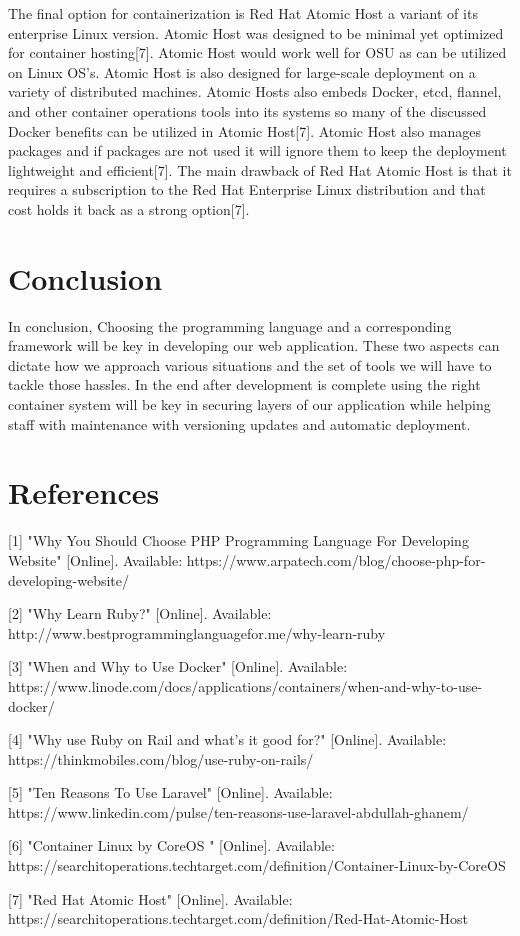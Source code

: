 \documentclass[letterpaper, 10pt, draftclsnofoot,onecolumn]{IEEEtran}
\begin{document}
The final option for containerization is Red Hat Atomic Host a variant of its enterprise Linux version. Atomic Host was designed to be minimal yet optimized for container hosting[7]. Atomic Host would work well for OSU as can be utilized on Linux OS’s. Atomic Host is also designed for large-scale deployment on a variety of distributed machines. Atomic Hosts also embeds Docker, etcd, flannel, and other container operations tools into its systems so many of the discussed Docker benefits can be utilized in Atomic Host[7]. Atomic Host also manages packages and if packages are not used it will ignore them to keep the deployment lightweight and efficient[7]. The main drawback of Red Hat Atomic Host is that it requires a subscription to the Red Hat Enterprise Linux distribution and that cost holds it back as a strong option[7]. 

\section{Conclusion}
In conclusion, Choosing the programming language and a corresponding framework will be key in developing our web application. These two aspects can dictate how we approach various situations and the set of tools we will have to tackle those hassles. In the end after development is complete using the right container system will be key in securing layers of our application while helping staff with maintenance with versioning updates and automatic deployment. 

\newpage
\section*{References}
[1] "Why You Should Choose PHP Programming Language For Developing Website" [Online]. Available: https://www.arpatech.com/blog/choose-php-for-developing-website/

[2] "Why Learn Ruby?" [Online]. Available: http://www.bestprogramminglanguagefor.me/why-learn-ruby

[3] "When and Why to Use Docker" [Online]. Available: https://www.linode.com/docs/applications/containers/when-and-why-to-use-docker/

[4] "Why use Ruby on Rail and what’s it good for?" [Online]. Available: https://thinkmobiles.com/blog/use-ruby-on-rails/

[5] "Ten Reasons To Use Laravel" [Online]. Available: https://www.linkedin.com/pulse/ten-reasons-use-laravel-abdullah-ghanem/

[6] "Container Linux by CoreOS " [Online]. Available: https://searchitoperations.techtarget.com/definition/Container-Linux-by-CoreOS

[7] "Red Hat Atomic Host" [Online]. Available: https://searchitoperations.techtarget.com/definition/Red-Hat-Atomic-Host  
\end{document}

